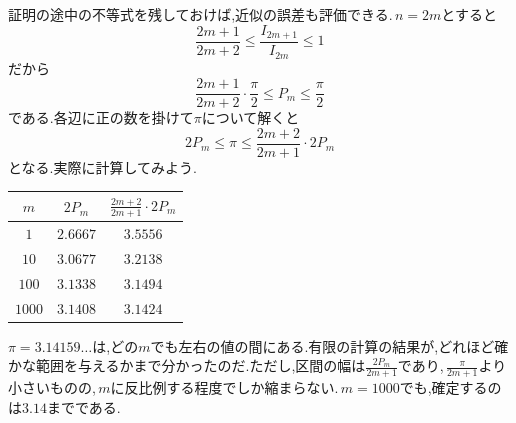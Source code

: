 証明の途中の不等式を残しておけば,近似の誤差も評価できる.\,$n=2m$とすると
\[
 \frac{2m+1}{2m+2}
 \le\frac{I_{2m+1}}{I_{2m}}\le1
\]
だから
\[
 \frac{2m+1}{2m+2}\cdot\frac{\pi}{2}
 \le P_m\le\frac{\pi}{2}
\]
である.各辺に正の数を掛けて$\pi$について解くと
\[
 2P_m\le\pi\le\frac{2m+2}{2m+1}\cdot2P_m
\]
となる.実際に計算してみよう.
\begin{center}
\begin{tabular}{ccc}
\toprule
$m$ & $2P_m$ & $\frac{2m+2}{2m+1}\cdot2P_m$\\
\midrule
$1$ & $2.6667$ & $3.5556$\\
$10$ & $3.0677$ & $3.2138$\\
$100$ & $3.1338$ & $3.1494$\\
$1000$ & $3.1408$ & $3.1424$\\
\bottomrule
\end{tabular}
\end{center}
$\pi=3.14159\ldots$は,どの$m$でも左右の値の間にある.有限の計算の結果が,どれほど確かな範囲を与えるかまで分かったのだ.ただし,区間の幅は$\frac{2P_m}{2m+1}$であり,\,$\frac{\pi}{2m+1}$より小さいものの,\,$m$に反比例する程度でしか縮まらない.\,$m=1000$でも,確定するのは$3.14$までである.
